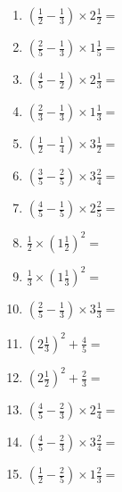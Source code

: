 \documentclass[12pt]{article}
\begin{document}
\begin{enumerate}
\item \large $ \left( \frac{1}{2} - \frac{1}{3} \right) \times 2 \frac{1}{2} = $ \vspace{1.6cm}
\item \large $ \left( \frac{2}{5} - \frac{1}{3} \right) \times 1 \frac{1}{5} = $ \vspace{1.6cm}
\item \large $ \left( \frac{4}{5} - \frac{1}{2} \right) \times 2 \frac{1}{3} = $ \vspace{1.6cm}
\item \large $ \left( \frac{2}{3} - \frac{1}{3} \right) \times 1 \frac{1}{3} = $ \vspace{1.6cm}
\item \large $ \left( \frac{1}{2} - \frac{1}{4} \right) \times 3 \frac{1}{2} = $ \vspace{1.6cm}
\newpage
\item \large $ \left( \frac{3}{5} - \frac{2}{5} \right) \times 3 \frac{2}{4} = $ \vspace{1.6cm}
\item \large $ \left( \frac{4}{5} - \frac{1}{5} \right) \times 2 \frac{2}{5} = $ \vspace{1.6cm}
\item \large $ \frac{1}{2} \times \left( 1 \frac{1}{2} \right)^2 = $ \vspace{1.6cm}
\item \large $ \frac{1}{3} \times \left( 1 \frac{1}{3} \right)^2 = $ \vspace{1.6cm}
\item \large $ \left( \frac{2}{5} - \frac{1}{3} \right) \times 3 \frac{1}{3} = $ \vspace{1.6cm}
\item \large $ \left( 2 \frac{1}{3} \right)^2 + \frac{4}{5} = $ \vspace{1.6cm}
\item \large $ \left( 2 \frac{1}{2} \right)^2 + \frac{2}{3} = $ \vspace{1.6cm}
\item \large $ \left( \frac{4}{5} - \frac{2}{3} \right) \times 2 \frac{1}{4} = $ \vspace{1.6cm}
\item \large $ \left( \frac{4}{5} - \frac{2}{3} \right) \times 3 \frac{2}{4} = $ \vspace{1.6cm}
\item \large $ \left( \frac{1}{2} - \frac{2}{5} \right) \times 1 \frac{2}{3} = $ \vspace{1.6cm}
\newpage

\end{enumerate}
\end{document}
